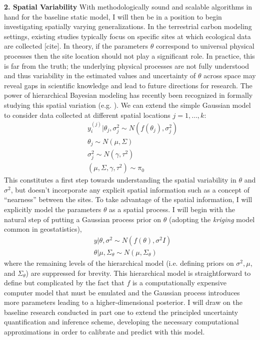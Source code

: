 \documentclass[12pt]{article}
\begin{document}
 \textbf{2. Spatial Variability} With methodologically sound and scalable algorithms in hand for the baseline static model, I will then be in a position to begin investigating spatially varying generalizations. 
 In the terrestrial carbon modeling settings, existing studies typically focus on specific sites at which ecological data are collected [cite]. In theory, if the parameters $\theta$ correspond to universal physical 
 processes then the site location should not play a significant role. In practice, this is far from the truth; the underlying physical processes are not fully understood and thus variability in the estimated values
 and uncertainty of $\theta$ across space may reveal gaps in scientific knowledge and lead to future directions for research. The power of hierarchical Bayesian modeling has recently been recognized in 
 formally studying this spatial variation (e.g. \cite{Fer2}). We can extend the simple Gaussian model to consider data collected at different spatial locations $j = 1, \dots, k$:
 \begin{align*}
 &y^{(j)}_i|\theta_j, \sigma_j^2 \sim N(f(\theta_j), \sigma_j^2) \\
 &\theta_j \sim N(\mu, \Sigma) \\
 &\sigma_j^2 \sim N(\gamma, \tau^2) \\
 &(\mu, \Sigma, \gamma, \tau^2) \sim \pi_0
 \end{align*}
 This constitutes a first step towards understanding the spatial variability in $\theta$ and $\sigma^2$, but doesn't incorporate any explicit spatial information such as a concept of ``nearness'' between the sites. 
 To take advantage of the spatial information, I will explicitly model the parameters $\theta$ as a spatial process. I will begin with the natural step of putting a Gaussian process prior on $\theta$ (adopting
 the \textit{kriging} model common in geostatistics),
 \begin{align*}
 &y|\theta, \sigma^2 \sim N(f(\theta), \sigma^2 I) \\
 &\theta|\mu, \Sigma_\theta \sim N(\mu, \Sigma_\theta)
 \end{align*}
 where the remaining levels of the hierarchical model (i.e. defining priors on $\sigma^2, \mu$, and $\Sigma_\theta$) are suppressed for brevity. This hierarchical model is straightforward to define
 but complicated by the fact that $f$ is a computationally expensive computer model that must be emulated and the Gaussian process introduces more parameters leading to a higher-dimensional 
 posterior. I will draw on the baseline research conducted in part one to extend the principled uncertainty quantification and inference scheme, developing the necessary computational approximations
 in order to calibrate and predict with this model. 
 
\end{document}
